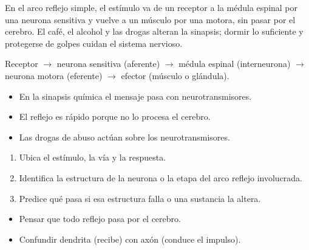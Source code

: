 \documentclass[10pt,a4paper,twocolumn]{article}
\begin{document}
En el arco reflejo simple, el estímulo va de un receptor a la médula espinal por una neurona sensitiva y vuelve a un músculo por una motora, sin pasar por el cerebro. El café, el alcohol y las drogas alteran la sinapsis; dormir lo suficiente y protegerse de golpes cuidan el sistema nervioso.

\begin{mecanismo}
Receptor $\rightarrow$ neurona sensitiva (aferente) $\rightarrow$ médula espinal (interneurona) $\rightarrow$ neurona motora (eferente) $\rightarrow$ efector (músculo o glándula).
\end{mecanismo}

\begin{ideasclave}
\begin{itemize}
  \item En la sinapsis química el mensaje pasa con neurotransmisores.
  \item El reflejo es rápido porque no lo procesa el cerebro.
  \item Las drogas de abuso actúan sobre los neurotransmisores.
\end{itemize}
\end{ideasclave}

\begin{metodo}
\begin{enumerate}
  \item Ubica el estímulo, la vía y la respuesta.
  \item Identifica la estructura de la neurona o la etapa del arco reflejo involucrada.
  \item Predice qué pasa si esa estructura falla o una sustancia la altera.
\end{enumerate}
\end{metodo}

\begin{errorfrecuente}
\begin{itemize}
  \item Pensar que todo reflejo pasa por el cerebro.
  \item Confundir dendrita (recibe) con axón (conduce el impulso).
\end{itemize}
\end{errorfrecuente}
\end{document}
